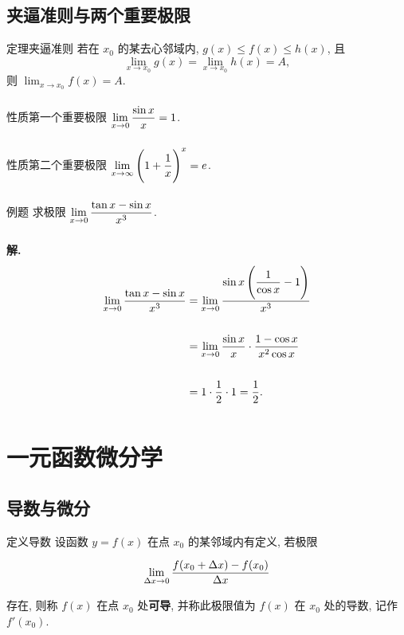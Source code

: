 \documentclass[a4paper,12pt,oneside,fontset=none]{ctexbook}
\renewcommand{\le}{\leqslant}
\let\olddfrac\dfrac
\renewcommand{\dfrac}[2]{
	\olddfrac{#1\vrule width 0pt height 1.15em depth 0em}{#2\vrule width 0pt height 0em depth 0.6em}
}
\let\oldlim\lim
\renewcommand{\lim}{\displaystyle\oldlim}
\newcounter{theorem}[chapter]
\newenvironment{theorem}[1][]{\begin{thmBox}{定理}{#1}}{\end{thmBox}}
\newenvironment{property}[1][]{\begin{thmBox}{性质}{#1}}{\end{thmBox}}
\newcounter{definition}[chapter]
\newenvironment{definition}[1][]{\begin{defBox}{定义}{#1}}{\end{defBox}}
\newcounter{example}[chapter]
\newenvironment{example}[1][]{\begin{exBox}{例题}{#1}}{\end{exBox}}
\numberwithin{equation}{chapter}
\begin{document}
	\section{夹逼准则与两个重要极限}
	
	\begin{theorem}[夹逼准则]
		若在 $x_0$ 的某去心邻域内, $g(x) \le f(x) \le h(x)$, 且
		\[
		\lim_{x \to x_0} g(x) = \lim_{x \to x_0} h(x) = A,
		\]
		则 $\lim_{x \to x_0} f(x) = A$.
	\end{theorem}
	
	\begin{property}[第一个重要极限]
		$\lim_{x \to 0} \dfrac{\sin x}{x} = 1$.
	\end{property}
	
	\begin{property}[第二个重要极限]
		$\lim_{x \to \infty}\left(1 + \dfrac{1}{x}\right)^{x} = e$.
	\end{property}
	
	\begin{example}
		求极限 $\lim_{x \to 0} \dfrac{\tan x - \sin x}{x^3}$.
	\end{example}
	
	\textbf{解.}
	\begin{align*}
		\lim_{x \to 0} \dfrac{\tan x - \sin x}{x^3}
		&= \lim_{x \to 0} \dfrac{\sin x\left(\dfrac{1}{\cos x} - 1\right)}{x^3} \\[6pt]
		&= \lim_{x \to 0} \dfrac{\sin x}{x} \cdot \dfrac{1 - \cos x}{x^2 \cos x} \\[6pt]
		&= 1 \cdot \dfrac{1}{2} \cdot 1 = \dfrac{1}{2}.
	\end{align*}
	
	\chapter{一元函数微分学}
	
	\section{导数与微分}
	
	\begin{definition}[导数]
		设函数 $y = f(x)$ 在点 $x_0$ 的某邻域内有定义, 若极限
		\[
		\lim_{\Delta x \to 0} \dfrac{f(x_0 + \Delta x) - f(x_0)}{\Delta x}
		\]
		存在, 则称 $f(x)$ 在点 $x_0$ 处\textbf{可导}, 并称此极限值为 $f(x)$ 在 $x_0$ 处的导数, 记作 $f'(x_0)$.
	\end{definition}
	
\end{document}

